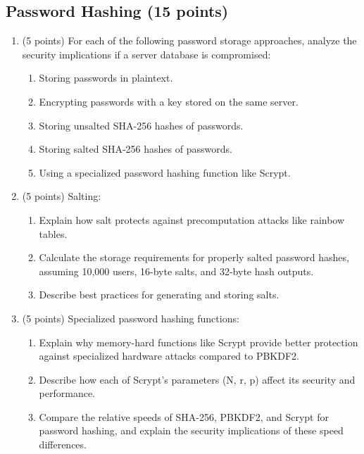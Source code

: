 \documentclass[10pt,a4paper,american]{article}
\begin{document}
\subsection{Password Hashing (15 points)}

\begin{enumerate}
	\item (5 points) For each of the following password storage approaches, analyze the security implications if a server database is compromised:
	      \begin{enumerate}
		      \item Storing passwords in plaintext.
		      \item Encrypting passwords with a key stored on the same server.
		      \item Storing unsalted SHA-256 hashes of passwords.
		      \item Storing salted SHA-256 hashes of passwords.
		      \item Using a specialized password hashing function like Scrypt.
	      \end{enumerate}

	\item (5 points) Salting:
	      \begin{enumerate}
		      \item Explain how salt protects against precomputation attacks like rainbow tables.
		      \item Calculate the storage requirements for properly salted password hashes, assuming 10,000 users, 16-byte salts, and 32-byte hash outputs.
		      \item Describe best practices for generating and storing salts.
	      \end{enumerate}

	\item (5 points) Specialized password hashing functions:
	      \begin{enumerate}
		      \item Explain why memory-hard functions like Scrypt provide better protection against specialized hardware attacks compared to PBKDF2.
		      \item Describe how each of Scrypt's parameters (N, r, p) affect its security and performance.
		      \item Compare the relative speeds of SHA-256, PBKDF2, and Scrypt for password hashing, and explain the security implications of these speed differences.
	      \end{enumerate}
\end{enumerate}
\end{document}

